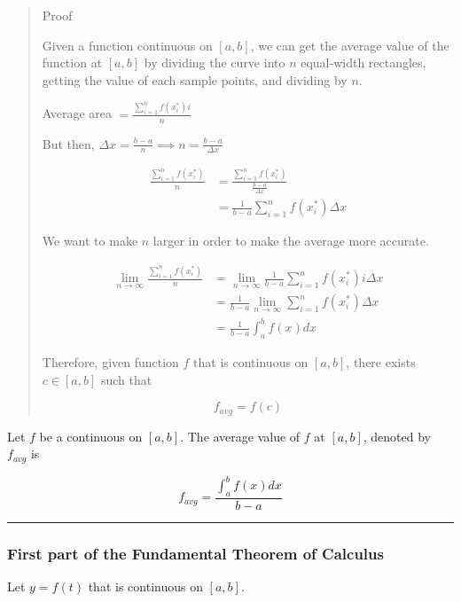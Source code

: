 \documentclass[
]{article}
\begin{document}
\begin{quote}
Proof

Given a function continuous on \([a,b]\), we can get the average value
of the function at \([a,b]\) by dividing the curve into \(n\)
equal-width rectangles, getting the value of each sample points, and
dividing by \(n\).

Average area \(\displaystyle = \frac{\sum_{i=1}^n f(x_i^*)i}{n}\)

But then,
\(\displaystyle \Delta x = \frac{b-a}{n} \implies n = \frac{b-a}{\Delta x}\)

\begin{align*}
\frac{\sum_{i=1}^n f(x_i^*)}{n} &= \frac{\sum_{i=1}^n f(x_i^*)}{\frac{b-a}{\Delta x}}\\
&= \frac{1}{b-a}\sum_{i=1}^n f(x_i^*) \Delta x
\end{align*}

We want to make \(n\) larger in order to make the average more accurate.

\begin{align*}
\lim_{n\to\infty}\frac{\sum_{i=1}^n f(x_i^*)}{n} &= \lim_{n\to\infty}\frac{1}{b-a}\sum_{i=1}^n f(x_i^*)i \Delta x\\
&= \frac{1}{b-a}\lim_{n\to\infty}\sum_{i=1}^n f(x_i^*) \Delta x\\
&= \frac{1}{b-a}\int_a^b f(x)dx
\end{align*}

Therefore, given function \(f\) that is continuous on \([a,b]\), there
exists \(c \in [a,b]\) such that

\[ f_{avg} = f(c) \]
\end{quote}

Let \(f\) be a continuous on \([a,b]\). The average value of \(f\) at
\([a,b]\), denoted by \(f_{avg}\) is

\[ f_{avg} = \frac{\int_a^b f(x)dx}{b-a} \]

\begin{center}\rule{0.5\linewidth}{0.5pt}\end{center}

\hypertarget{first-part-of-the-fundamental-theorem-of-calculus}{%
\subsubsection{First part of the Fundamental Theorem of
Calculus}\label{first-part-of-the-fundamental-theorem-of-calculus}}

Let \(y=f(t)\) that is continuous on \([a,b]\).
\end{document}
